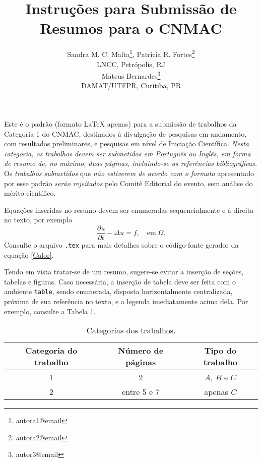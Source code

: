\documentclass{pssbmac}
\begin{document}

\title{Instruções para Submissão de Resumos para o CNMAC}

\author{
    {\large Sandra M. C. Malta}\thanks{autora1@email}, {\large Patricia R. Fortes}\thanks{autora2@email}\\
    {\small LNCC, Petrópolis, RJ} \\
    {\large Mateus Bernardes}\thanks{autor3@email}  \\
    {\small DAMAT/UTFPR, Curitiba, PR} \\
}
\criartitulo



Este é o padrão (formato \LaTeX{} apenas) para a submissão de trabalhos da Categoria 1 do CNMAC, destinados à divulgação de pesquisas em andamento, com resultados preliminares, e pesquisas em nível de Iniciação Científica. \emph{Nesta categoria, os trabalhos devem ser submetidos em Português ou Inglês, em forma de resumo de, no máximo, duas páginas, incluindo-se as referências bibliográficas.} Os \emph{trabalhos submetidos} que \emph{não estiverem de acordo com o formato} apresentado por esse padrão \emph{serão rejeitados} pelo Comitê Editorial do evento, sem análise do mérito científico.

Equações inseridas no resumo devem ser enumeradas sequencialmente e à direita no texto, por exemplo
\begin{equation}
\frac{\partial u}{\partial t}-\Delta u = f, \quad  \mathrm{em} \; \Omega. \label{Calor}
\end{equation}
Consulte o arquivo \verb!.tex! para mais detalhes sobre o código-fonte gerador da equação \eqref{Calor}.

Tendo em vista tratar-se de um resumo, sugere-se evitar a inserção de seções, tabelas e figuras. Caso necessária, a inserção de tabela deve ser feita com o ambiente \verb!table!, sendo enumerada, disposta horizontalmente centralizada, próxima de sua referência no texto, e a legenda imediatamente acima dela. Por exemplo, consulte a Tabela \ref{tabela01}.

\begin{table}[H]
\caption{ {\small Categorias dos trabalhos.}}
\centering
\begin{tabular}{ccc}
\hline
Categoria do trabalho  & Número de páginas & Tipo do trabalho\\ \hline
1          & 2  & $A$, $B$ e $C$    \\
2          & entre 5 e 7  & apenas $C$ \\
\hline
\end{tabular}\label{tabela01}
\end{table}
\end{document}
